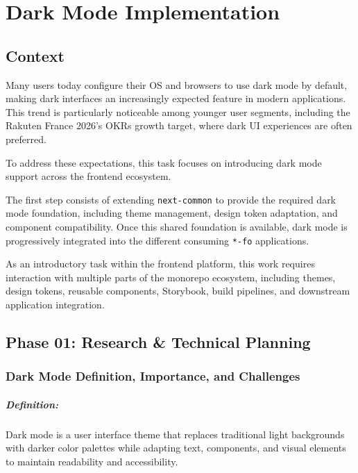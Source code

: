 \chapter{Dark Mode Implementation}

\section{Context}

Many users today configure their \acf{OS} and browsers to use dark mode by default, making dark interfaces an increasingly expected feature in modern applications. This trend is particularly noticeable among younger user segments, including the Rakuten France 2026's \acf{OKRs} growth target, where dark UI experiences are often preferred.

To address these expectations, this task focuses on introducing dark mode support across the frontend ecosystem.

The first step consists of extending \texttt{next-common} to provide the required dark mode foundation, including theme management, design token adaptation, and component compatibility. Once this shared foundation is available, dark mode is progressively integrated into the different consuming \texttt{*-fo} applications.

As an introductory task within the frontend platform, this work requires interaction with multiple parts of the monorepo ecosystem, including themes, design tokens, reusable components, Storybook, build pipelines, and downstream application integration.

\section{Phase 01: Research \& Technical Planning}

\subsection{Dark Mode Definition, Importance, and Challenges}

\paragraph{Definition:}

Dark mode is a user interface theme that replaces traditional light backgrounds with darker color palettes while adapting text, components, and visual elements to maintain readability and accessibility.

